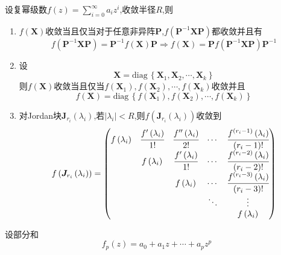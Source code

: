 \begin{formal}
    \begin{theorem}[矩阵幂级数收敛的等价命题]\label{thm:矩阵幂级数收敛的等价命题}
        设复幂级数$\displaystyle f\left(z\right)=\sum_{i=0}^{\infty}a_iz^i$,收敛半径$R$,则\begin{enumerate}[label={\textup{(\arabic*)}}]
            \item $f\left(\bm{X}\right)$收敛当且仅当对于任意非异阵$\bm{P}$,$f\left(
                \bm{P}^{-1}\bm{X}\bm{P}
            \right)$都收敛并且有\[
            f\left(\bm{P}^{-1}\bm{X}\bm{P}\right)=\bm{P}^{-1}f\left(\bm{X}\right)\bm{P}
            \Longrightarrow f\left(\bm{X}\right)=\bm{P}f\left(
                \bm{P}^{-1}\bm{X}\bm{P}
            \right)\bm{P}^{-1}
            \]
            \item 设\[\bm{X}=\mathrm{diag}\,\left\{
                \bm{X}_1,\bm{X}_2,\cdots,\bm{X}_k
            \right\}\]则$f\left(\bm{X}\right)$收敛当且仅当$f\left(
                \bm{X}_1
            \right),f\left(
                \bm{X}_2
            \right),\cdots,f\left(
                \bm{X}_k
            \right)$收敛并且\[
            f\left(\bm{X}\right)=\mathrm{diag}\,\left\{
                f\left(
                    \bm{X}_1
                \right),f\left(
                    \bm{X}_2
                \right),\cdots,f\left(
                    \bm{X}_k
                \right)
            \right\}
            \]
            \item 对\textup{Jordan}块$\bm{J}_{r_i}\left(\lambda_i\right)$,若$\left|\lambda_i\right|<R$,则$f\left(
                \bm{J}_{r_i}\left(\lambda_i\right)
            \right)$收敛到\[
            f\left(
                \bm{J}_{r_i}\left(\lambda_i\right)
            \right)=\begin{pmatrix}
                f\left(\lambda_i\right)&\cfrac{f'\left(\lambda_i\right)}{1!}&\cfrac{f''\left(\lambda_i\right)}{2!}&\cdots&\cfrac{f^{\left(r_i-1\right)}\left(\lambda_i\right)}{\left(r_i-1\right)!}\\
                &f\left(\lambda_i\right)&\cfrac{f'\left(\lambda_i\right)}{1!}&\cdots&\cfrac{f^{\left(r_i-2\right)}\left(\lambda_i\right)}{\left(r_i-2\right)!}\\
                &&f\left(\lambda_i\right)&\cdots&\cfrac{f^{\left(r_i-3\right)}\left(\lambda_i\right)}{\left(r_i-3\right)!}\\
                &&&\ddots&\vdots\\
                &&&&f\left(\lambda_i\right)
            \end{pmatrix}
            \]
        \end{enumerate}
    \end{theorem}
    \begin{Proof}
        设部分和\[
        f_p\left(z\right)=a_0+a_1z+\cdots+a_pz^p
        \]
        

\end{Proof}
\end{formal}
